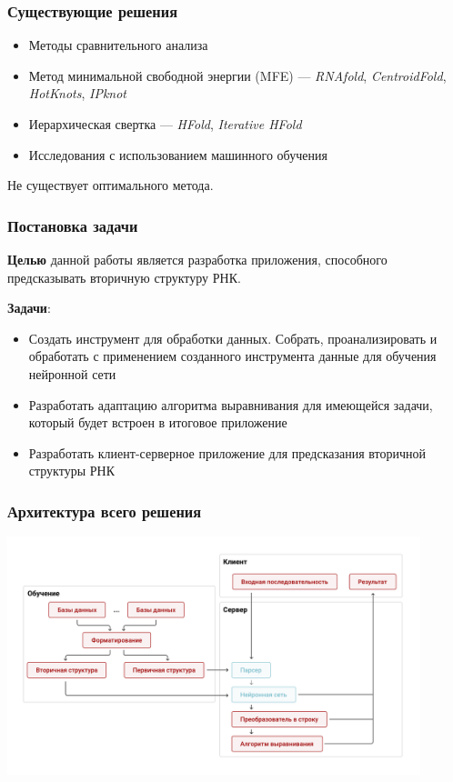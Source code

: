 \documentclass{beamer}
\begin{document}
\begin{frame}
  \transwipe[direction=90]
  \frametitle{Существующие решения}
  \begin{itemize}
  	\item Методы сравнительного анализа
    \item Метод минимальной свободной энергии (MFE) --- \textit{RNAfold}, \textit{CentroidFold}, \textit{HotKnots}, \textit{IPknot}
    \item Иерархическая свертка --- \textit{HFold}, \textit{Iterative HFold}
    \item Исследования с использованием машинного обучения
   
  \end{itemize}\medskip
   Не существует оптимального метода.

\end{frame}

\begin{frame}
  \transwipe[direction=90]
  \frametitle{Постановка задачи}
  \textbf{Целью} данной работы является разработка приложения, способного предсказывать вторичную структуру РНК.
  
  \textbf{Задачи}:
  \begin{itemize}
    \item Создать инструмент для обработки данных. Собрать, проанализировать и обработать с применением созданного инструмента данные для обучения нейронной сети
    \item Разработать адаптацию алгоритма выравнивания для имеющейся задачи, который будет встроен в итоговое приложение
    \item Разработать клиент-серверное приложение для предсказания вторичной структуры РНК
  \end{itemize}
\end{frame}
            
\begin{frame}[fragile]
\transwipe[direction=90]
\frametitle{Архитектура всего решения}
\includegraphics[width=12cm]{./pictures/diag3.pdf}
\end{frame}
\end{document}
